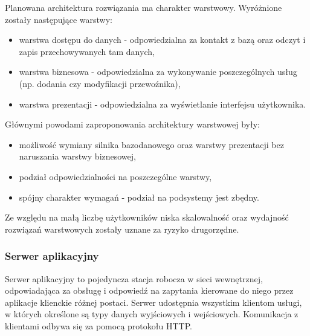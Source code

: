 \documentclass[10pt,a4paper]{article}
\begin{document}
Planowana architektura rozwiązania ma charakter warstwowy. Wyróżnione zostały następujące warstwy:
\begin{itemize}
	\item warstwa dostępu do danych - odpowiedzialna za kontakt z bazą oraz odczyt i zapis przechowywanych tam danych,
	\item warstwa biznesowa - odpowiedzialna za wykonywanie poszczególnych usług (np. dodania czy modyfikacji przewoźnika),
	\item warstwa prezentacji - odpowiedzialna za wyświetlanie interfejsu użytkownika.
	\end{itemize}
	Głównymi powodami zaproponowania architektury warstwowej były:
	\begin{itemize}
	\item możliwość wymiany silnika bazodanowego oraz warstwy prezentacji bez naruszania warstwy biznesowej,
	\item podział odpowiedzialności na poszczególne warstwy,
	\item spójny charakter wymagań - podział na podsystemy jest zbędny.
\end{itemize}
Ze względu na małą liczbę użytkowników niska skalowalność oraz wydajność rozwiązań warstwowych zostały uznane za ryzyko drugorzędne.

\subsubsection{Serwer aplikacyjny}
Serwer aplikacyjny to pojedyncza stacja robocza w sieci wewnętrznej, odpowiadająca za obsługę i odpowiedź na zapytania kierowane do niego przez aplikacje klienckie różnej postaci. Serwer udostępnia wszystkim klientom usługi, w których określone są typy danych wyjściowych i wejściowych. Komunikacja z klientami odbywa się za pomocą protokołu HTTP.
\end{document}
